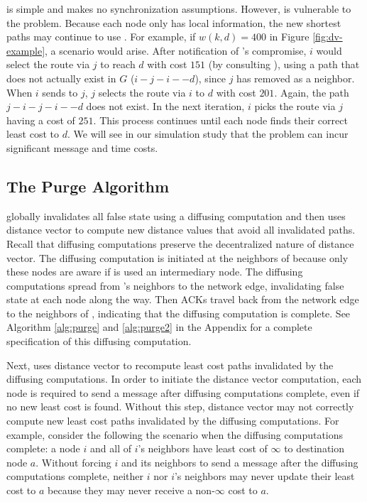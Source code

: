 \second is simple and makes no synchronization assumptions. %
However, \second is vulnerable to the \infinity problem. Because each node only has local information, the new shortest paths may continue to use \bads.
For example, if $w(k,d)=400$ in Figure \ref{fig:dv-example}, a \infinity scenario would arise. After notification of \bads's compromise, 
$i$ would select the route via $j$ to reach $d$ with cost $151$ (by consulting \dmatrixis), using a path that does not actually exist in $G$ ($i-j-i-$\bads$-d$), since $j$ has removed \bad as a 
neighbor. When $i$ sends \minvi to $j$, $j$ selects the route via $i$
to $d$ with cost $201$. Again, the path $j-i-j-i-$\bads$-d$ does not exist.  In the next iteration, $i$ 
picks the route via $j$ having a cost of $251$. This process continues until each node finds their 
correct least cost to $d$.  We will see in our simulation study that the \infinity problem can incur significant message and time costs.




\subsection{The Purge Algorithm}
\label{subsec:purge}


\purge globally invalidates all false state using a diffusing computation and then uses distance vector to compute new distance values that avoid all invalidated paths.
Recall that diffusing computations preserve the decentralized nature of distance vector.
The diffusing computation is initiated at the neighbors of \bad because only these nodes are 
aware if \bad is used an intermediary node. The diffusing computations spread from \bads's neighbors to the network edge, invalidating false state at each node along the way. 
Then ACKs travel back from the network edge to the neighbors of \bads, indicating that the diffusing computation is complete. 
See Algorithm \ref{alg:purge} and \ref{alg:purge2} in the Appendix for a complete specification of this diffusing computation.

Next, \purge uses distance vector to recompute least cost paths invalidated by the diffusing computations.  In order to initiate the distance vector computation, each 
node is required to send a message after diffusing computations complete, even if no new least cost is found.  Without this step, distance vector may not correctly compute new least cost 
paths invalidated by the diffusing computations.  For example, consider the following the scenario when the diffusing computations complete: a node $i$ and all of $i$'s neighbors have 
least cost of $\infty$ to destination node $a$. Without forcing $i$ and its neighbors to send a message after the diffusing computations complete, neither $i$ nor $i$'s neighbors may
never update their least cost to $a$ because they may never receive a non-$\infty$ cost to $a$.

